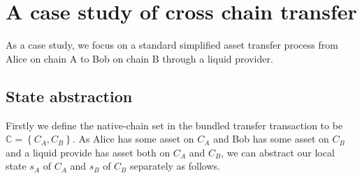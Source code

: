 \documentclass[pageno]{jpaper}
\begin{document}
\section{A case study of cross chain transfer}
As a case study, we focus on a standard simplified asset transfer process from Alice on chain A to Bob on chain B through a liquid provider. 
\subsection{State abstraction}
Firstly we define the native-chain set in the bundled transfer transaction to be $\mathbb{C} = \left\{C_A, C_B\right\}$. As Alice has some asset on $C_A$ and Bob has some asset on $C_B$ and a liquid provide has asset both on $C_A$ and $C_B$, we can abstract our local state $s_A$ of $C_A$ and $s_B$ of $C_B$ separately as follows.
\end{document}
